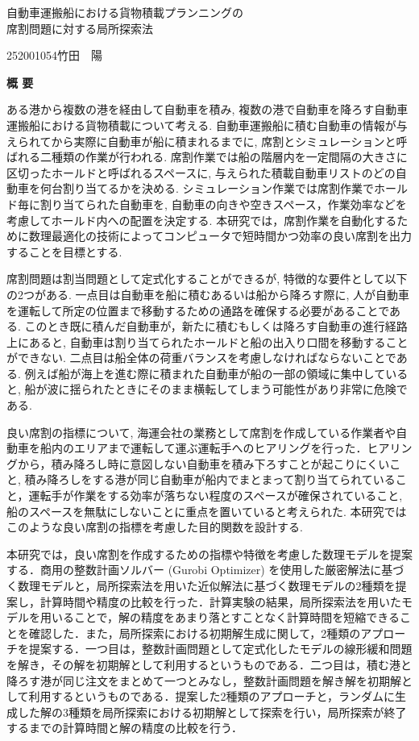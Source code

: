 \begin{center}
{\LARGE 自動車運搬船における貨物積載プランニングの\\席割問題に対する局所探索法}\\[0.5cm]
\end{center}
\hfill
{\large 252001054\qquad 竹田　陽}\\[0.5cm]
\begin{center}
{\Large \bf 概 要}\\
\end{center}

ある港から複数の港を経由して自動車を積み, 複数の港で自動車を降ろす自動車運搬船における貨物積載について考える. 自動車運搬船に積む自動車の情報が与えられてから実際に自動車が船に積まれるまでに, 席割とシミュレーションと呼ばれる二種類の作業が行われる. 席割作業では船の階層内を一定間隔の大きさに区切ったホールドと呼ばれるスペースに, 与えられた積載自動車リストのどの自動車を何台割り当てるかを決める. シミュレーション作業では席割作業でホールド毎に割り当てられた自動車を, 自動車の向きや空きスペース，作業効率などを考慮してホールド内への配置を決定する. 本研究では，席割作業を自動化するために数理最適化の技術によってコンピュータで短時間かつ効率の良い席割を出力することを目標とする.

席割問題は割当問題として定式化することができるが, 特徴的な要件として以下の2つがある. 一点目は自動車を船に積むあるいは船から降ろす際に, 人が自動車を運転して所定の位置まで移動するための通路を確保する必要があることである. このとき既に積んだ自動車が，新たに積むもしくは降ろす自動車の進行経路上にあると, 自動車は割り当てられたホールドと船の出入り口間を移動することができない. 二点目は船全体の荷重バランスを考慮しなければならないことである. 例えば船が海上を進む際に積まれた自動車が船の一部の領域に集中していると, 船が波に揺られたときにそのまま横転してしまう可能性があり非常に危険である.

良い席割の指標について, 海運会社の業務として席割を作成している作業者や自動車を船内のエリアまで運転して運ぶ運転手へのヒアリングを行った．ヒアリングから，積み降ろし時に意図しない自動車を積み下ろすことが起こりにくいこと, 積み降ろしをする港が同じ自動車が船内でまとまって割り当てられていること，運転手が作業をする効率が落ちない程度のスペースが確保されていること, 船のスペースを無駄にしないことに重点を置いていると考えられた. 本研究ではこのような良い席割の指標を考慮した目的関数を設計する.

本研究では，良い席割を作成するための指標や特徴を考慮した数理モデルを提案する．商用の整数計画ソルバー (Gurobi Optimizer) を使用した厳密解法に基づく数理モデルと，局所探索法を用いた近似解法に基づく数理モデルの2種類を提案し，計算時間や精度の比較を行った．計算実験の結果，局所探索法を用いたモデルを用いることで，解の精度をあまり落とすことなく計算時間を短縮できることを確認した．また，局所探索における初期解生成に関して，2種類のアプローチを提案する．一つ目は，整数計画問題として定式化したモデルの線形緩和問題を解き，その解を初期解として利用するというものである．二つ目は，積む港と降ろす港が同じ注文をまとめて一つとみなし，整数計画問題を解き解を初期解として利用するというものである．提案した2種類のアプローチと，ランダムに生成した解の3種類を局所探索における初期解として探索を行い，局所探索が終了するまでの計算時間と解の精度の比較を行う．
